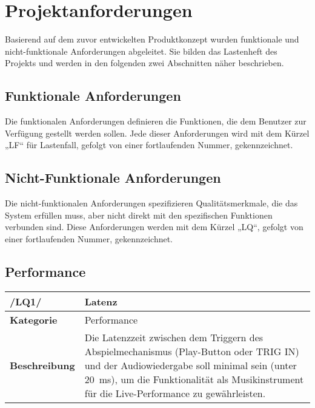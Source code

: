\newpage
\section{Projektanforderungen}

Basierend auf dem zuvor entwickelten Produktkonzept wurden funktionale und nicht-funktionale Anforderungen abgeleitet. Sie bilden das Lastenheft des Projekts und werden in den folgenden zwei Abschnitten näher beschrieben.

\subsection{Funktionale Anforderungen}
Die funktionalen Anforderungen definieren die Funktionen, die dem Benutzer zur Verfügung gestellt werden sollen. Jede dieser Anforderungen wird mit dem Kürzel „LF“ für Lastenfall, gefolgt von einer fortlaufenden Nummer, gekennzeichnet.



\newpage

\subsection{Nicht-Funktionale Anforderungen}
Die nicht-funktionalen Anforderungen spezifizieren Qualitätsmerkmale, die das System erfüllen muss, aber nicht direkt mit den spezifischen Funktionen verbunden sind. Diese Anforderungen werden mit dem Kürzel „LQ“, gefolgt von einer fortlaufenden Nummer, gekennzeichnet.


\subsection{Performance}

\begin{table}[h!]
\begin{tabularx}{\textwidth}{|l|X|}
		\hline
		\textbf{/LQ1/} & \textbf{Latenz} \\ \hline
		\textbf{Kategorie} & Performance \\ \hline
		\textbf{Beschreibung} & Die Latenzzeit zwischen dem Triggern des Abspielmechanismus (Play-Button oder TRIG IN) und der Audiowiedergabe soll minimal sein (unter \SI{20}{\milli\second}), um die Funktionalität als Musikinstrument für die Live-Performance zu gewährleisten. \\ \hline
	\end{tabularx}
\end{table}


